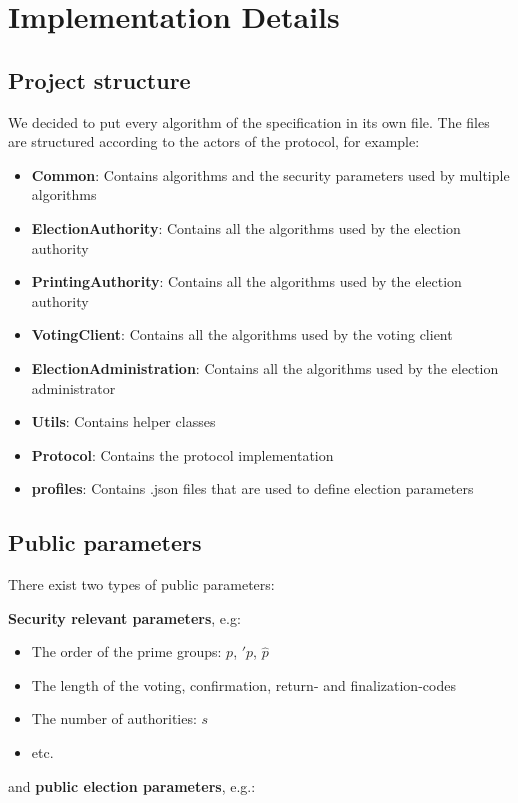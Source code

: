 \documentclass[a4paper,12pt]{report}
\begin{document}
\chapter{Implementation Details}
\section{Project structure}
We decided to put every algorithm of the specification in its own file. The files are structured according to the actors of the protocol, for example:

\begin{itemize}
	\item \textbf{Common}: Contains algorithms and the security parameters used by multiple algorithms
	\item \textbf{ElectionAuthority}: Contains all the algorithms used by the election authority
	\item \textbf{PrintingAuthority}: Contains all the algorithms used by the election authority
	\item \textbf{VotingClient}: Contains all the algorithms used by the voting client
	\item \textbf{ElectionAdministration}: Contains all the algorithms used by the election administrator
	\item \textbf{Utils}: Contains helper classes
	\item \textbf{Protocol}: Contains the protocol implementation
	\item \textbf{profiles}: Contains .json files that are used to define election parameters
\end{itemize}

\section{Public parameters}
There exist two types of public parameters:

\textbf{Security relevant parameters}, e.g:

\begin{itemize}
	\item The order of the prime groups: $p$, $\prime{p}$, $\hat{p}$
	\item The length of the voting, confirmation, return- and finalization-codes
	\item The number of authorities: $s$
	\item etc.
\end{itemize}

and \textbf{public election parameters}, e.g.:
\end{document}
